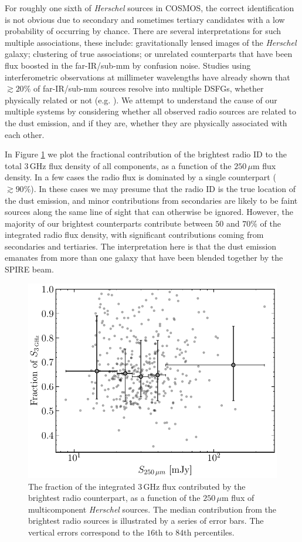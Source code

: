 For roughly one sixth of \textit{Herschel} sources in COSMOS, the correct identification is not obvious due to secondary and sometimes tertiary candidates with a low probability of occurring by chance. There are several interpretations for such multiple associations, these include: gravitationally lensed images of the \textit{Herschel} galaxy; clustering of true associations; or unrelated counterparts that have been flux boosted in the far-IR/sub-mm by confusion noise. Studies using interferometric observations at millimeter wavelengths have already shown that $\gtrsim 20\%$ of far-IR/sub-mm sources resolve into multiple DSFGs, whether physically related or not (e.g. \citealt{Wang_2011, Karim_2013, Simpson_2015, Stach_2018}). We attempt to understand the cause of our multiple systems by considering whether all observed radio sources are related to the dust emission, and if they are, whether they are physically associated with each other.

In Figure \ref{fig:multiples_flux_contribution} we plot the fractional contribution of the brightest radio ID to the total $3\,$GHz flux density of all components, as a function of the $250\,\mu$m flux density. In a few cases the radio flux is dominated by a single counterpart ($\gtrsim 90\%$). In these cases we may presume that the radio ID is the true location of the dust emission, and minor contributions from secondaries are likely to be faint sources along the same line of sight that can otherwise be ignored. However, the majority of our brightest counterparts contribute between $50$ and $70\%$ of the integrated radio flux density, with significant contributions coming from secondaries and tertiaries. The interpretation here is that the dust emission emanates from more than one galaxy that have been blended together by the SPIRE beam.

\begin{figure}
	\centering
	\includegraphics[width=0.79\columnwidth]{Figures/Figure_5_6.pdf}
	\caption[Contribution to total radio flux from multicomponent radio sources]{The fraction of the integrated $3\,$GHz flux contributed by the brightest radio counterpart, as a function of the $250\,\mu$m flux of multicomponent \textit{Herschel} sources. The median contribution from the brightest radio sources is illustrated by a series of error bars. The vertical errors correspond to the $16$th to $84$th percentiles.}
	\label{fig:multiples_flux_contribution}
\end{figure}

